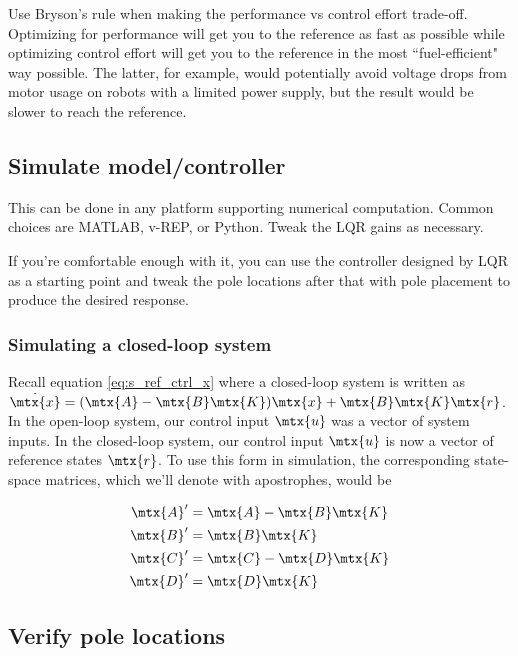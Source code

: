 Use Bryson's rule when making the performance vs \gls{control effort} trade-off.
Optimizing for performance will get you to the \gls{reference} as fast as
possible while optimizing \gls{control effort} will get you to the
\gls{reference} in the most ``fuel-efficient" way possible. The latter, for
example, would potentially avoid voltage drops from motor usage on robots with a
limited power supply, but the result would be slower to reach the
\gls{reference}.

\subsection{Simulate model/controller}

This can be done in any platform supporting numerical computation. Common
choices are MATLAB, v-REP, or Python. Tweak the LQR gains as necessary.

If you're comfortable enough with it, you can use the controller designed by LQR
as a starting point and tweak the pole locations after that with pole placement
to produce the desired response.

\subsubsection{Simulating a closed-loop system}

Recall equation \eqref{eq:s_ref_ctrl_x} where a closed-loop system is written as
$\dot{\mtx{x}} = (\mtx{A} - \mtx{B}\mtx{K})\mtx{x} + \mtx{B}\mtx{K}\mtx{r}$. In
the open-loop \gls{system}, our \gls{control input} $\mtx{u}$ was a vector of
\gls{system} \glspl{input}. In the closed-loop \gls{system}, our
\gls{control input} $\mtx{u}$ is now a vector of \gls{reference} \glspl{state}
$\mtx{r}$. To use this form in simulation, the corresponding state-space
matrices, which we'll denote with apostrophes, would be

\begin{align*}
  \mtx{A}' &= \mtx{A} - \mtx{B}\mtx{K} \\
  \mtx{B}' &= \mtx{B}\mtx{K} \\
  \mtx{C}' &= \mtx{C} - \mtx{D}\mtx{K} \\
  \mtx{D}' &= \mtx{D}\mtx{K}
\end{align*}

\subsection{Verify pole locations}

